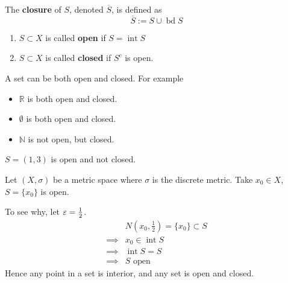 
\begin{definition}[Closure]
    The \textbf{closure} of $S$, denoted $\overline{S}$, is defined as 
    \[
    \overline{S} := S \cup \operatorname{bd}  S
    \]
\end{definition}

\begin{definition}
    \hfill
    \begin{enumerate}
        \item $S \subset X$ is called \textbf{open} if $S = \operatorname{int} S$
        \item $S \subset X$ is called \textbf{closed} if $S^c$ is open.
    \end{enumerate}
\end{definition}

\begin{remark}
    A set can be both open and closed. For example 
    \begin{itemize}
        \item $\mathbb{R}$ is both open and closed.
        \item $\emptyset$ is both open and closed.
        \item $\mathbb{N}$ is not open, but closed.
    \end{itemize} 
\end{remark}

\begin{example}
    $S = (1, 3)$ is open and not closed.
\end{example}

\begin{example}
    Let $(X, \sigma)$ be a metric space where $\sigma$ is the discrete 
    metric. Take $x_0 \in X$, $S = \{ x_0 \} $ is open. 
    \medskip 

    To see why, let $\varepsilon = \frac{1}{2}$. 
    \begin{align*}
        & N \left(x_0, \frac{1}{2} \right) = \{ x_0 \}  \subset S \\
        \implies & x_0 \in \operatorname{int}  S \\
        \implies & \operatorname{int}  S = S \\
        \implies & S \text{ open}
    \end{align*}
    Hence any point in a set is interior, and any set is open and closed.
\end{example}

